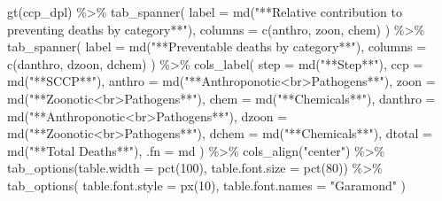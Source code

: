 \documentclass[
  letterpaper,
  DIV=11,
  numbers=noendperiod]{scrartcl}
\newenvironment{Shaded}{\begin{snugshade}}{\end{snugshade}}
\newcommand{\AttributeTok}[1]{\textcolor[rgb]{0.40,0.45,0.13}{#1}}
\newcommand{\DecValTok}[1]{\textcolor[rgb]{0.68,0.00,0.00}{#1}}
\newcommand{\FunctionTok}[1]{\textcolor[rgb]{0.28,0.35,0.67}{#1}}
\newcommand{\NormalTok}[1]{\textcolor[rgb]{0.00,0.23,0.31}{#1}}
\newcommand{\SpecialCharTok}[1]{\textcolor[rgb]{0.37,0.37,0.37}{#1}}
\newcommand{\StringTok}[1]{\textcolor[rgb]{0.13,0.47,0.30}{#1}}
\begin{document}
\begin{Shaded}
\begin{Highlighting}[]
\FunctionTok{gt}\NormalTok{(ccp\_dpl) }\SpecialCharTok{\%\textgreater{}\%} 
  \FunctionTok{tab\_spanner}\NormalTok{(}
    \AttributeTok{label =} \FunctionTok{md}\NormalTok{(}\StringTok{"**Relative contribution to preventing deaths by category**"}\NormalTok{),}
    \AttributeTok{columns =} \FunctionTok{c}\NormalTok{(anthro, zoon, chem)}
\NormalTok{  ) }\SpecialCharTok{\%\textgreater{}\%} 
  \FunctionTok{tab\_spanner}\NormalTok{(}
  \AttributeTok{label =} \FunctionTok{md}\NormalTok{(}\StringTok{"**Preventable deaths by category**"}\NormalTok{),}
  \AttributeTok{columns =} \FunctionTok{c}\NormalTok{(danthro, dzoon, dchem)}
\NormalTok{  ) }\SpecialCharTok{\%\textgreater{}\%} 
  \FunctionTok{cols\_label}\NormalTok{(}
\AttributeTok{step =} \FunctionTok{md}\NormalTok{(}\StringTok{"**Step**"}\NormalTok{),}
\AttributeTok{ccp =} \FunctionTok{md}\NormalTok{(}\StringTok{"**SCCP**"}\NormalTok{),}
\AttributeTok{anthro =} \FunctionTok{md}\NormalTok{(}\StringTok{"**Anthroponotic\textless{}br\textgreater{}Pathogens**"}\NormalTok{),}
\AttributeTok{zoon =} \FunctionTok{md}\NormalTok{(}\StringTok{"**Zoonotic\textless{}br\textgreater{}Pathogens**"}\NormalTok{),}
\AttributeTok{chem =} \FunctionTok{md}\NormalTok{(}\StringTok{"**Chemicals**"}\NormalTok{),}
\AttributeTok{danthro =} \FunctionTok{md}\NormalTok{(}\StringTok{"**Anthroponotic\textless{}br\textgreater{}Pathogens**"}\NormalTok{),}
\AttributeTok{dzoon =} \FunctionTok{md}\NormalTok{(}\StringTok{"**Zoonotic\textless{}br\textgreater{}Pathogens**"}\NormalTok{),}
\AttributeTok{dchem =} \FunctionTok{md}\NormalTok{(}\StringTok{"**Chemicals**"}\NormalTok{),}
\AttributeTok{dtotal =} \FunctionTok{md}\NormalTok{(}\StringTok{"**Total Deaths**"}\NormalTok{),}
\AttributeTok{.fn =}\NormalTok{ md}
\NormalTok{) }\SpecialCharTok{\%\textgreater{}\%} 
  \FunctionTok{cols\_align}\NormalTok{(}\StringTok{"center"}\NormalTok{) }\SpecialCharTok{\%\textgreater{}\%} 
\FunctionTok{tab\_options}\NormalTok{(}\AttributeTok{table.width =} \FunctionTok{pct}\NormalTok{(}\DecValTok{100}\NormalTok{), }\AttributeTok{table.font.size =} \FunctionTok{pct}\NormalTok{(}\DecValTok{80}\NormalTok{)) }\SpecialCharTok{\%\textgreater{}\%} 
  \FunctionTok{tab\_options}\NormalTok{(}
    \AttributeTok{table.font.style =} \FunctionTok{px}\NormalTok{(}\DecValTok{10}\NormalTok{),}
    \AttributeTok{table.font.names =} \StringTok{"Garamond"}
\NormalTok{  )}
\end{Highlighting}
\end{Shaded}
\end{document}
